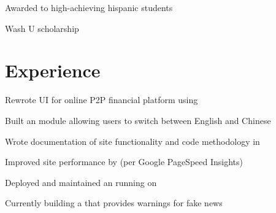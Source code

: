 \documentclass[]{deedy-resume-openfont}
\begin{document}
\begin{minipage}[t]{0.33\textwidth}
\begin{tightemize}
\item Awarded to high-achieving hispanic students
\end{tightemize}

\begin{tightemize}
\item Wash U scholarship
\end{tightemize}

\sectionsep

%
%

\end{minipage}
\hfill
\begin{minipage}[t]{0.66\textwidth}


\section{Experience}

\vspace{\topsep} %
\begin{tightemize}
\item Rewrote UI for online P2P financial platform using 
\item Built an  module allowing users to switch between English and Chinese
\item Wrote documentation of site functionality and code methodology in 
\item Improved site performance by  (per Google PageSpeed Insights)
\end{tightemize}
\sectionsep

\begin{tightemize}
\item Deployed and maintained an  running  on  
\item Currently building a  that provides warnings for fake news
\end{tightemize}
\sectionsep


\end{minipage}
\end{document}
